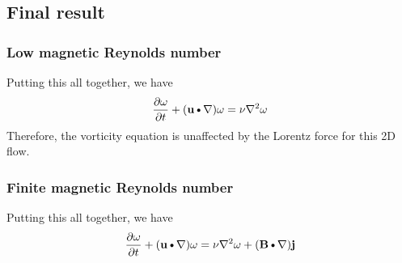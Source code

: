 \documentclass[11pt]{article}
\newcommand{\DOT}{\text{\textbullet}}
\newcommand{\B}{\mathbf{B}}
\newcommand{\J}{\mathbf{j}}
\newcommand{\U}{\mathbf{u}}
\newcommand{\PD}{\partial}
\begin{document}
\subsection{Final result}
\subsubsection{Low magnetic Reynolds number}
Putting this all together, we have
\begin{equation*}
	\frac{\PD \omega}{\PD t} +
	(\U \DOT \nabla) \omega =
	\nu \nabla^2 \omega
\end{equation*}
Therefore, the vorticity equation is unaffected by the Lorentz force for this 2D flow.

\subsubsection{Finite magnetic Reynolds number}
Putting this all together, we have
\begin{equation*}
	\frac{\PD \omega}{\PD t} +
	(\U \DOT \nabla) \omega =
	\nu \nabla^2 \omega + (\B \DOT \nabla) \J
\end{equation*}
\end{document}

